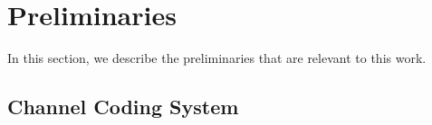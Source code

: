 \documentclass[conference]{IEEEtran}
\begin{document}
\begin{itemize}





    	
    \end{itemize}


 
        
     
       
 





%
%
%
% 


\section{Preliminaries} 
In this section, we describe the preliminaries that are relevant to this work. 
 



\subsection{Channel Coding System}
\end{document}
